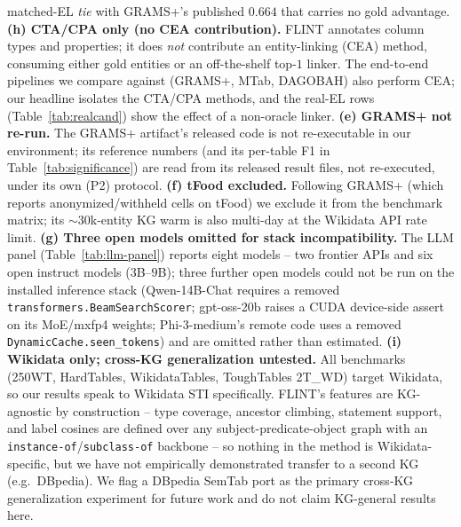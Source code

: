 \documentclass[11pt]{article}
\begin{document}
matched-EL \emph{tie} with GRAMS+'s published $0.664$ that carries no gold advantage.
\textbf{(h) CTA/CPA only (no CEA contribution).} FLINT annotates column types and
properties; it does \emph{not} contribute an entity-linking (CEA) method, consuming
either gold entities or an off-the-shelf top-$1$ linker. The end-to-end pipelines we
compare against (GRAMS+, MTab, DAGOBAH) also perform CEA; our headline isolates the
CTA/CPA methods, and the real-EL rows (Table~\ref{tab:realcand}) show the effect of a
non-oracle linker.
\textbf{(e) GRAMS+ not re-run.} The GRAMS+ artifact's released code is not
re-executable in our environment; its reference numbers (and its per-table F1 in
Table~\ref{tab:significance}) are read from its released result files, not re-executed,
under its own (P2) protocol.
\textbf{(f) tFood excluded.} Following GRAMS+ (which reports anonymized/withheld cells
on tFood) we exclude it from the benchmark matrix; its $\sim$$30$k-entity KG warm is
also multi-day at the Wikidata API rate limit.
\textbf{(g) Three open models omitted for stack incompatibility.} The LLM panel
(Table~\ref{tab:llm-panel}) reports eight models -- two frontier APIs and six open
instruct models ($3$B--$9$B); three further open models could not be run on the
installed inference stack (Qwen-14B-Chat requires a removed
\texttt{transformers.BeamSearchScorer}; gpt-oss-20b raises a CUDA device-side assert on
its MoE/mxfp4 weights; Phi-3-medium's remote code uses a removed
\texttt{DynamicCache.seen\_tokens}) and are omitted rather than estimated.
\textbf{(i) Wikidata only; cross-KG generalization untested.} All benchmarks (250WT,
HardTables, WikidataTables, ToughTables 2T\_WD) target Wikidata, so our results speak to
Wikidata STI specifically. FLINT's features are KG-agnostic by construction -- type
coverage, ancestor climbing, statement support, and label cosines are defined over any
subject-predicate-object graph with an \texttt{instance-of}/\texttt{subclass-of}
backbone -- so nothing in the method is Wikidata-specific, but we have not empirically
demonstrated transfer to a second KG (e.g.\ DBpedia). We flag a DBpedia SemTab port as
the primary cross-KG generalization experiment for future work and do not claim
KG-general results here.

\end{document}
